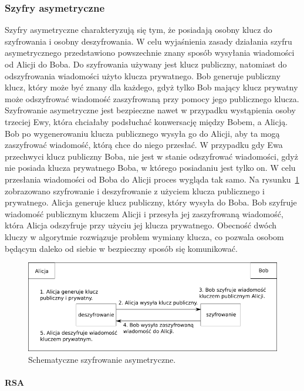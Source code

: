 \documentclass[12p]{article}
\begin{document}
\subsubsection{Szyfry asymetryczne}

\quad Szyfry asymetryczne charakteryzują się tym, że posiadają osobny klucz do szyfrowania i osobny deszyfrowania. W celu wyjaśnienia zasady działania szyfru asymetrycznego przedstawiono powszechnie znany sposób wysyłania wiadomości od Alicji do Boba. Do szyfrowania używany jest klucz publiczny, natomiast do odszyfrowania wiadomości użyto klucza prywatnego. Bob generuje publiczny klucz, który może być znany dla każdego, gdyż tylko Bob mający klucz prywatny może odszyfrować wiadomość zaszyfrowaną przy pomocy jego publicznego klucza. Szyfrowanie asymetryczne jest bezpieczne nawet w przypadku wystąpienia osoby trzeciej Ewy, która chciałaby podsłuchać konwersację między Bobem, a Alicją. Bob po wygenerowaniu klucza publicznego wysyła go do Alicji, aby ta mogą zaszyfrować wiadomość, którą chce do niego przesłać. W przypadku gdy Ewa przechwyci klucz publiczny Boba, nie jest w stanie odszyfrować wiadomości, gdyż nie posiada klucza prywatnego Boba, w którego posiadaniu jest tylko on. W celu przesłania wiadomości od Boba do Alicji proces wygląda tak samo. Na rysunku~\ref{rsa} zobrazowano szyfrowanie i deszyfrowanie z użyciem klucza publicznego i prywatnego. Alicja generuje klucz publiczny, który wysyła do Boba. Bob szyfruje wiadomość publicznym kluczem Alicji i przesyła jej zaszyfrowaną wiadomość, która Alicja odszyfruje przy użyciu jej klucza prywatnego. Obecność dwóch kluczy w algorytmie rozwiązuje problem wymiany klucza, co pozwala osobom będącym daleko od siebie w bezpieczny sposób się komunikować.  


\begin{figure}[H]
\centering
\includegraphics[width=15cm]{rsa.png}
\caption{Schematyczne szyfrowanie asymetryczne.}\label{rsa}
\end{figure}

\paragraph{RSA} \mbox{} \\
\end{document}
